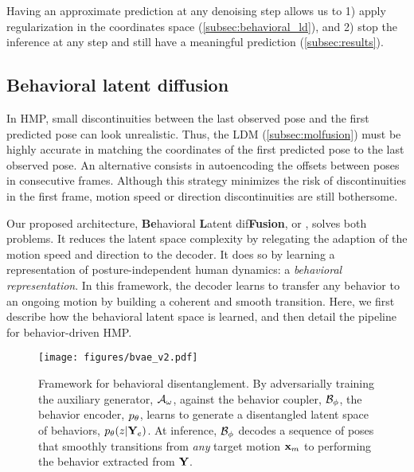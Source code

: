 \documentclass[10pt,twocolumn,letterpaper]{article}
\begin{document}
Having an approximate prediction at any denoising step allows us to 1) apply regularization in the coordinates space (\autoref{subsec:behavioral_ld}), and 2) stop the inference at any step and still have a meaningful prediction (\autoref{subsec:results}). 






\subsection{Behavioral latent diffusion}
\label{subsec:behavioral_ld}

In HMP, small discontinuities between the last observed pose and the first predicted pose can look unrealistic. Thus, the LDM (\autoref{subsec:molfusion}) must be highly accurate in matching the coordinates of the first predicted pose to the last observed pose. 
An alternative consists in autoencoding the offsets between poses in consecutive frames. Although this strategy minimizes the risk of discontinuities in the first frame, motion speed or direction discontinuities are still bothersome.

Our proposed architecture, \textbf{Be}havioral \textbf{L}atent dif\textbf{Fusion}, or \modelname{}, solves both problems. It reduces the latent space complexity by relegating the adaption of the motion speed and direction to the decoder. It does so by learning a representation of posture-independent human dynamics: a \textit{behavioral representation}. In this framework, the decoder learns to transfer any behavior to an ongoing motion by building a coherent and smooth transition. Here, we first describe how the behavioral latent space is learned, and then detail the \modelname{} pipeline for behavior-driven HMP. 


\begin{figure}[t]
    \centering
    \texttt{[image: figures/bvae\_v2.pdf]}
    \vspace{-0.5cm}
    \caption{Framework for behavioral disentanglement. By adversarially training the auxiliary generator, $\mathcal{A}_{\omega}$, against the behavior coupler, $\mathcal{B}_{\phi}$, the behavior encoder, $p_{\theta}$, learns to generate a disentangled latent space of behaviors, $p_{\theta}(z | \mathbf{Y}_{e})$. At inference, $\mathcal{B}_{\phi}$ decodes a sequence of poses that smoothly transitions from \textit{any} target motion $\mathbf{x}_{m}$ to performing the behavior extracted from $\mathbf{Y}$.}
    \label{fig:bvae}
    \vspace{-0.5cm}
\end{figure}
\end{document}
